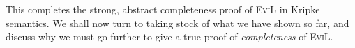 This completes the strong, abstract completeness proof of
\textsc{EviL} in Kripke semantics.  
We shall now turn to taking stock of what we have
shown so far, and discuss why we must go further to give a true proof of
\emph{completeness} of \textsc{EviL}.

